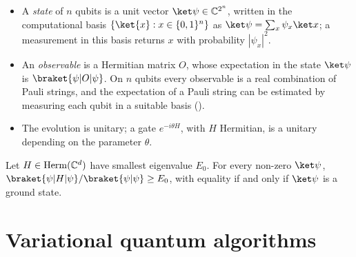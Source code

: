 \documentclass[handoutsbeamer.tex]{subfiles}
\begin{document}
\begin{frame}
\begin{itemize}\setlength\itemsep{0.3em}
    \item A \emph{state} of $n$ qubits is a unit vector $\ket\psi \in \C^{2^n}$, written in the computational basis $\{\ket{x} : x \in \{0,1\}^n\}$ as $\ket\psi = \sum_x \psi_x \ket x$; a measurement in this basis returns $x$ with probability $|\psi_x|^2$.
    \item An \emph{observable} is a Hermitian matrix $O$, whose expectation in the state $\ket\psi$ is $\braket{\psi|O|\psi}$. On $n$ qubits every observable is a real combination of Pauli strings, and the expectation of a Pauli string can be estimated by measuring each qubit in a suitable basis ().
    \item The evolution is unitary; a gate $e^{-i\theta H}$, with $H$ Hermitian, is a unitary depending on the parameter $\theta$.
\end{itemize}
\begin{thm}\label{thm:ch05:variational}
Let $H \in \mathrm{Herm}(\mathbb{C}^d)$ have smallest eigenvalue $E_0$. For every non-zero $\ket\psi$, $\braket{\psi|H|\psi}/\braket{\psi|\psi} \ge E_0$, with equality if and only if $\ket\psi$ is a ground state.
\end{thm}
\end{frame}

\section{Variational quantum algorithms}\label{sec:ch05:vqa}
\end{document}
